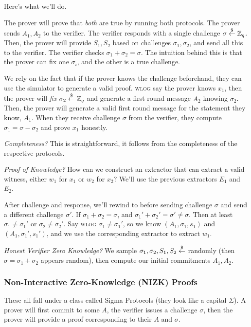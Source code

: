 Here's what we'll do.


The prover will prove that \emph{both} are true by running both protocols. The prover sends $A_1, A_2$ to the verifier. The verifier responds with a single challenge $\sigma\overset{\$}{\leftarrow} \mathbb Z_q$. Then, the prover will provide $S_1, S_2$ based on challenges $\sigma_1, \sigma_2$, and send all this to the verifier. The verifier checks $\sigma_1 + \sigma_2 = \sigma$. The intuition behind this is that the prover can fix one $\sigma_i$, and the other is a true challenge.

We rely on the fact that if the prover knows the challenge beforehand, they can use the simulator to generate a valid proof. \textsc{wlog} say the prover knows $x_1$, then the prover will \emph{fix} $\sigma_2\overset{\$}{\leftarrow} \mathbb Z_q$ and generate a first round message $A_2$ knowing $\sigma_2$. Then, the prover will generate a valid first round message for the statement they know, $A_1$. When they receive challenge $\sigma$ from the verifier, they compute $\sigma_1 = \sigma - \sigma_2$ and prove $x_1$ honestly.

\emph{Completeness?} This is straightforward, it follows from the completeness of the respective protocols.

\emph{Proof of Knowledge?} How can we construct an extractor that can extract a valid witness, either $w_1$ for $x_1$ or $w_2$ for $x_2$? We'll use the previous extractors $E_1$ and $E_2$.

After challenge and response, we'll rewind to before sending challenge $\sigma$ and send a different challenge $\sigma'$. If $\sigma_1 + \sigma_2 = \sigma$, and $\sigma_1' + \sigma_2' = \sigma'\neq \sigma$. Then at least $\sigma_1\neq \sigma_1'$ or $\sigma_2\neq\sigma_2'$. Say \textsc{wlog} $\sigma_1\neq \sigma_1'$, so we know $(A_1, \sigma_1, s_1)$ and $(A_1, \sigma_1', s_1')$, and we use the corresponding extractor to extract $w_1$.

\emph{Honest Verifier Zero Knowledge?} We sample $\sigma_1, \sigma_2, S_1, S_2\overset{\$}{\leftarrow}$ randomly (then $\sigma = \sigma_1 + \sigma_2$ appears random), then compute our initial commitments $A_1, A_2$.

\subsubsection{Non-Interactive Zero-Knowledge (NIZK) Proofs}
These all fall under a class called Sigma Protocols (they look like a capital $\Sigma$). A prover will first commit to some $A$, the verifier issues a challenge $\sigma$, then the prover will provide a proof corresponding to their $A$ and $\sigma$.

